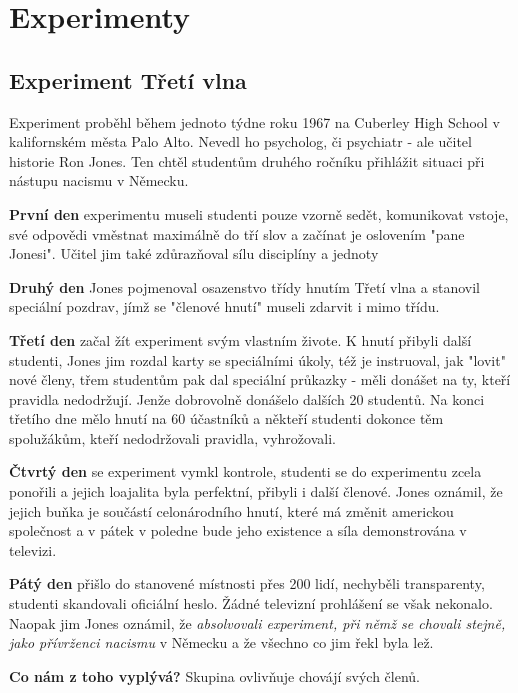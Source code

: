 \documentclass[a4paper,12pt]{report}
\begin{document}
\newpage
\pagelogos
\section[Experimenty]{Experimenty}
\begin{samepage}
\subsection*{Experiment Třetí vlna}
\label{Experiment-Treti-Vlna}
Experiment proběhl během jednoto týdne roku 1967 na Cuberley High School v kalifornském města Palo Alto. Nevedl ho psycholog, či psychiatr - ale učitel historie Ron Jones. Ten chtěl studentům druhého ročníku přihlážit situaci při nástupu nacismu v Německu.

\textbf{První den} experimentu museli studenti pouze vzorně sedět, komunikovat vstoje, své odpovědi vměstnat maximálně do tří slov a začínat je oslovením "pane Jonesi". Učitel jim také zdůrazňoval sílu disciplíny a jednoty

\textbf{Druhý den} Jones pojmenoval osazenstvo třídy hnutím Třetí vlna a stanovil speciální pozdrav, jímž se "členové hnutí" museli zdarvit i mimo třídu.

\textbf{Třetí den} začal žít experiment svým vlastním živote. K hnutí přibyli další studenti, Jones jim rozdal karty se speciálními úkoly, též je instruoval, jak "lovit" nové členy, třem studentům pak dal speciální průkazky - měli donášet na ty, kteří pravidla nedodržují. Jenže dobrovolně donášelo dalších 20 studentů. Na konci třetího dne mělo hnutí na 60 účastníků a někteří studenti dokonce těm spolužákům, kteří nedodržovali pravidla, vyhrožovali.

\textbf{Čtvrtý den} se experiment vymkl kontrole, studenti se do experimentu zcela ponořili a jejich loajalita byla perfektní, přibyli i další členové. Jones oznámil, že jejich buňka je součástí celonárodního hnutí, které má změnit americkou společnost a v pátek v poledne bude jeho existence a síla demonstrována v televizi.

\textbf{Pátý den} přišlo do stanovené místnosti přes 200 lidí, nechyběli transparenty, studenti skandovali oficiální heslo. Žádné televizní prohlášení se však nekonalo. Naopak jim Jones oznámil, že \textit{absolvovali experiment, při němž se chovali stejně, jako přívrženci nacismu} v Německu a že všechno co jim řekl byla lež.

\begin{flushleft}
\textbf{\large Co nám z toho vyplývá?} Skupina ovlivňuje chovájí svých členů.
\end{flushleft}
\end{samepage}
\end{document}
